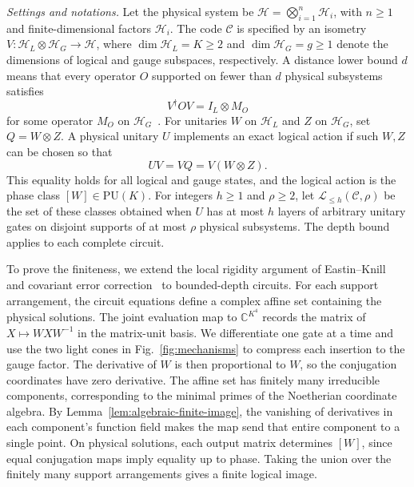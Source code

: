 \documentclass[aps,prl,reprint,notitlepage,nofootinbib,nobibnotes]{revtex4-2}
\newcommand{\HH}{\mathcal H}
\newcommand{\PU}{\mathrm{PU}}
\newcommand{\id}{I}
\begin{document}
 \textit{Settings and notations.} Let the physical system be \(\HH=\bigotimes_{i=1}^{n}\HH_i\), with
\(n\ge1\) and finite-dimensional factors $\HH_i$. The code \(\mathcal C\) is specified
by an isometry \(V:\HH_L\otimes\HH_G\longrightarrow\HH\), where
\(\dim\HH_L=K\ge2\) and \(\dim\HH_G=g\ge1\) denote the dimensions of logical and
gauge subspaces, respectively.
A distance lower bound \(d\) means that every operator \(O\) supported on
fewer than \(d\) physical subsystems satisfies
\begin{equation}\label{eq:correctable}
  V^\dagger O V=\id_L\otimes M_O
\end{equation}
for some operator \(M_O\) on \(\HH_G\)~\cite{KL,Kribs}.
For unitaries \(W\) on \(\HH_L\) and \(Z\) on \(\HH_G\), set
\(Q=W\otimes Z\). A physical unitary \(U\) implements an exact
logical action if such \(W,Z\) can be chosen so that
\begin{equation}\label{eq:encoded}
  UV=VQ=V(W\otimes Z).
\end{equation}
This equality holds for all logical and gauge states, and the logical
action is the phase class \([W]\in\PU(K)\).
For integers \(h\ge1\) and \(\rho\ge2\), let
\(\mathcal L_{\le h}(\mathcal C,\rho)\) be the set of these classes obtained
when \(U\) has at most \(h\) layers of arbitrary unitary gates on disjoint
supports of at most \(\rho\) physical subsystems.
The depth bound applies to each complete circuit.

To prove the finiteness, we extend the local rigidity argument of Eastin--Knill~\cite{EK} and
covariant error correction~\cite{Faist,LiuZhou} to bounded-depth circuits.
For each support arrangement, the circuit equations define a complex
affine set containing the physical solutions. The joint evaluation map
to \(\mathbb C^{K^4}\) records the matrix of \(X\mapsto WXW^{-1}\)
in the matrix-unit basis.
We differentiate one gate at a time and use the two light cones in
Fig.~\ref{fig:mechanisms} to compress each insertion to the gauge factor.
The derivative of \(W\) is then proportional to \(W\), so the conjugation
coordinates have zero derivative. The affine set has finitely many
irreducible components, corresponding to the minimal primes of the
Noetherian coordinate algebra. By Lemma~\ref{lem:algebraic-finite-image},
the vanishing of derivatives in each component's function field makes
the map send that entire component to a single point. On physical
solutions, each output matrix determines \([W]\), since equal
conjugation maps imply equality up to phase. Taking the union over the
finitely many support arrangements gives a finite logical image.
\end{document}
